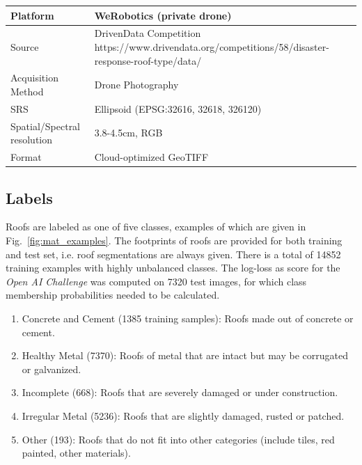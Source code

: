 \documentclass[11pt]{article}
\begin{document}
	\begin{center}
		\bgroup
		\def\arraystretch{1.1}
		\begin{tabular}{ | m{5cm} | m{10cm}|} 
			\hline
			Platform & WeRobotics (private drone)  \\ 
			\hline
			Source & DrivenData Competition \newline https://www.drivendata.org/competitions/58/disaster-response-roof-type/data/ \\ 
			\hline
			Acquisition Method & Drone Photography  \\ 
			\hline
			SRS  & Ellipsoid (EPSG:32616, 32618, 326120)  \\ 
			\hline
			Spatial/Spectral resolution & 3.8-4.5cm, RGB  \\ 
			\hline
			Format & Cloud-optimized GeoTIFF \\ 
			\hline
		\end{tabular}
		\egroup		
		\label{tab:general}
	\end{center}
	
	\subsection{Labels}
	Roofs are labeled as one of five classes, examples of which are given in Fig.~\ref{fig:mat_examples}. The footprints of roofs are provided for both training and test set, i.e. roof segmentations are always given. There is a total of 14852 training examples with highly unbalanced classes.
	The log-loss as score for the \textit{Open AI Challenge} was computed on 7320 test images, for which class membership probabilities needed to be calculated.
	
	\begin{enumerate}
		\itemsep0em
		\item Concrete and Cement (1385 training samples): Roofs made out of concrete or cement.
		\item Healthy Metal (7370): Roofs of metal that are intact but may be corrugated or galvanized.
		\item Incomplete (668): Roofs that are severely damaged or under construction.
		\item Irregular Metal (5236): Roofs that are slightly damaged, rusted or patched.
		\item Other (193): Roofs that do not fit into other categories (include tiles, red painted, other materials).
	\end{enumerate}
\end{document}
